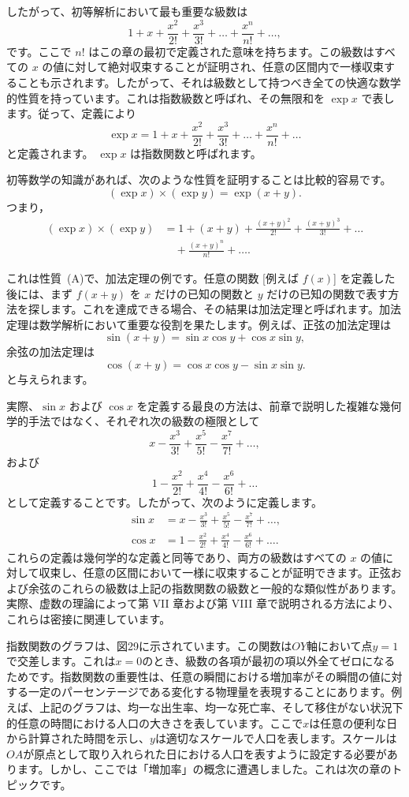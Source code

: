 \documentclass[a4paper,11pt,openany]{ltjsbook}
\begin{document}
したがって、初等解析において最も重要な級数は
\[
1 + x + \frac{x^{2}}{2!} + \frac{x^{3}}{3!} + \dots + \frac{x^{n}}{n!} + \dots,
\]
です。ここで $n!$ はこの章の最初で定義された意味を持ちます。この級数はすべての $x$ の値に対して絶対収束することが証明され、任意の区間内で一様収束することも示されます。したがって、それは級数として持つべき全ての快適な数学的性質を持っています。これは指数級数と呼ばれ、その無限和を $\exp x$ で表します。従って、定義により
\[
\exp x = 1 + x + \frac{x^{2}}{2!} + \frac{x^{3}}{3!} + \dots + \frac{x^{n}}{n!} + \dots
\]
と定義されます。
$\exp x$ は指数関数と呼ばれます。

初等数学の知識があれば、次のような性質を証明することは比較的容易です。
\[
(\exp x) \times (\exp y) = \exp(x + y).
\]
つまり，
\begin{align*}
(\exp x) \times (\exp y) &= 1 + (x + y) + \frac{(x + y)^2}{2!} + \frac{(x + y)^3}{3!} + \dots \\
                          &\quad + \frac{(x + y)^n}{n!} + \dots.
\end{align*}

これは性質~(A)で、加法定理の例です。任意の関数 [例えば $f(x)$] を定義した後には、まず $f(x + y)$ を $x$ だけの已知の関数と $y$ だけの已知の関数で表す方法を探します。これを達成できる場合、その結果は加法定理と呼ばれます。加法定理は数学解析において重要な役割を果たします。例えば、正弦の加法定理は
\[
\sin(x + y) = \sin x \cos y + \cos x \sin y,
\]
余弦の加法定理は
\[
\cos(x + y) = \cos x \cos y - \sin x \sin y.
\]
と与えられます。

実際、$\sin x$ および $\cos x$ を定義する最良の方法は、前章で説明した複雑な幾何学的手法ではなく、それぞれ次の級数の極限として
\[
x - \frac{x^3}{3!} + \frac{x^5}{5!} - \frac{x^7}{7!} + \dots,
\]
および
\[
1 - \frac{x^2}{2!} + \frac{x^4}{4!} - \frac{x^6}{6!} + \dots
\]
として定義することです。したがって、次のように定義します。
\begin{align*}
\sin x &= x - \frac{x^3}{3!} + \frac{x^5}{5!} - \frac{x^7}{7!} + \dots, \\
\cos x &= 1 - \frac{x^2}{2!} + \frac{x^4}{4!} - \frac{x^6}{6!} + \dots.
\end{align*}
これらの定義は幾何学的な定義と同等であり、両方の級数はすべての $x$ の値に対して収束し、任意の区間において一様に収束することが証明できます。正弦および余弦のこれらの級数は上記の指数関数の級数と一般的な類似性があります。実際、虚数の理論によって第 VII 章および第 VIII 章で説明される方法により、これらは密接に関連しています。

指数関数のグラフは、図29に示されています。この関数は$OY$軸において点$y=1$で交差します。これは$x=0$のとき、級数の各項が最初の項以外全てゼロになるためです。指数関数の重要性は、任意の瞬間における増加率がその瞬間の値に対する一定のパーセンテージである変化する物理量を表現することにあります。例えば、上記のグラフは、均一な出生率、均一な死亡率、そして移住がない状況下的任意の時間における人口の大きさを表しています。ここで$x$は任意の便利な日から計算された時間を示し、$y$は適切なスケールで人口を表します。スケールは$OA$が原点として取り入れられた日における人口を表すように設定する必要があります。しかし、ここでは「増加率」の概念に遭遇しました。これは次の章のトピックです。
\end{document}
